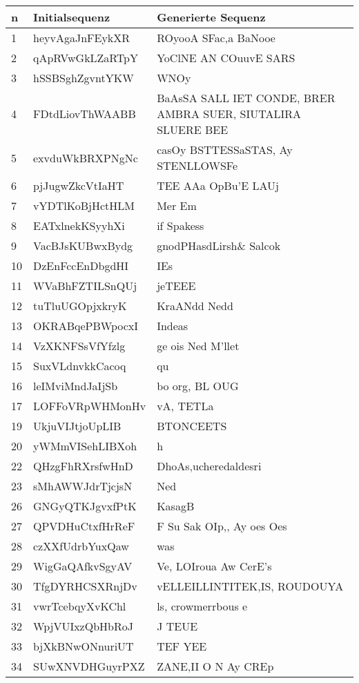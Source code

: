 \begin{center}
    \begin{table}
        \centering
        \begin{tabular}{ |l|l|l| }

            \hline
            \textbf{n} & \textbf{Initialsequenz} & \textbf{Generierte Sequenz} \\
            \hline
            1 &  heyvAgaJnFEykXR & ROyooA SFac,a BaNooe \\
            2 &  qApRVwGkLZaRTpY & YoClNE AN COuuvE SARS \\
            3 &  hSSBSghZgvntYKW & WNOy \\
            4 &  FDtdLiovThWAABB & BaAsSA SALL IET CONDE, BRER AMBRA SUER, SIUTALIRA SLUERE BEE \\
            5 &  exvduWkBRXPNgNc & casOy BSTTESSaSTAS, Ay STENLLOWSFe \\
            6 &  pjJugwZkcVtIaHT & TEE AAa OpBu'E LAUj \\
            7 &  vYDTlKoBjHctHLM & Mer Em \\
            8 &  EATxlnekKSyyhXi & if Spakess \\
            9 &  VacBJsKUBwxBydg & gnodPHasdLirsh\& Salcok \\
            10 & DzEnFccEnDbgdHI & IEs \\
            11 & WVaBhFZTILSnQUj & jeTEEE \\
            12 & tuTluUGOpjxkryK & KraANdd Nedd \\
            13 & OKRABqePBWpocxI & Indeas \\
            14 & VzXKNFSsVfYfzlg & ge ois Ned M'llet \\
            15 & SuxVLdnvkkCacoq & qu \\
            16 & leIMviMndJaIjSb & bo org, BL OUG \\
            17 & LOFFoVRpWHMonHv & vA, TETLa \\
            19 & UkjuVIJtjoUpLIB & BTONCEETS \\
            20 & yWMmVISehLIBXoh & h \\
            22 & QHzgFhRXrsfwHnD & DhoAs,ucheredaldesri \\
            23 & sMhAWWJdrTjcjsN & Ned \\
            26 & GNGyQTKJgvxfPtK & KasagB \\
            27 & QPVDHuCtxfHrReF & F Su Sak OIp,, Ay oes Oes \\
            28 & czXXfUdrbYuxQaw & was \\
            29 & WigGaQAfkvSgyAV & Ve, LOIroua Aw CerE's \\
            30 & TfgDYRHCSXRnjDv & vELLEILLINTITEK,IS, ROUDOUYA \\
            31 & vwrTcebqyXvKChl & ls, crowmerrbous e \\
            32 & WpjVUIxzQbHbRoJ & J TEUE \\
            33 & bjXkBNwONnuriUT & TEF YEE \\
            34 & SUwXNVDHGuyrPXZ & ZANE,II  O N Ay CREp \\


\end{tabular}
\end{table}
\end{center}
